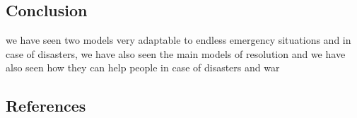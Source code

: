 \documentclass[letterpaper]{article} %
\begin{document}
    \subsection{Conclusion}

    we have seen two models very adaptable to endless emergency situations and in case of disasters, we have also seen
    the main models of resolution and we have also seen how they can help people in case of disasters and war

    \subsection{References}

    
\end{document}
